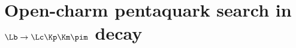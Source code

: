 \chapter{Open-charm pentaquark search in $\Lb\to\Lc\Kp\Km\pim$ decay}
\label{app:opencharm_appendix}






